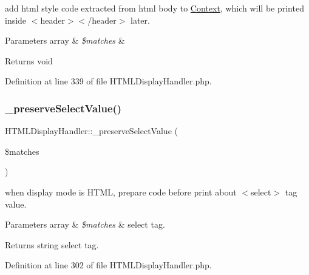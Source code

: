add html style code extracted from html body to \hyperlink{classContext}{Context}, which will be printed inside $<$header$>$$<$/header$>$ later. 
\begin{DoxyParams}[1]{Parameters}
array & {\em \$matches} & \\
\hline
\end{DoxyParams}
\begin{DoxyReturn}{Returns}
void 
\end{DoxyReturn}


Definition at line 339 of file H\+T\+M\+L\+Display\+Handler.\+php.

\mbox{\label{classHTMLDisplayHandler_ab9baa231fb3294a6efcf9062b4ec7b89}} 
\subsubsection{\texorpdfstring{\+\_\+preserve\+Select\+Value()}{\_preserveSelectValue()}}
{\footnotesize\ttfamily H\+T\+M\+L\+Display\+Handler\+::\+\_\+preserve\+Select\+Value (\begin{DoxyParamCaption}\item[{}]{\$matches }\end{DoxyParamCaption})}

when display mode is H\+T\+ML, prepare code before print about $<$select$>$ tag value. 
\begin{DoxyParams}[1]{Parameters}
array & {\em \$matches} & select tag. \\
\hline
\end{DoxyParams}
\begin{DoxyReturn}{Returns}
string select tag. 
\end{DoxyReturn}


Definition at line 302 of file H\+T\+M\+L\+Display\+Handler.\+php.

\mbox{\label{classHTMLDisplayHandler_a45d8439c35b8be8f97aeca3fb4e8dd7f}} 
